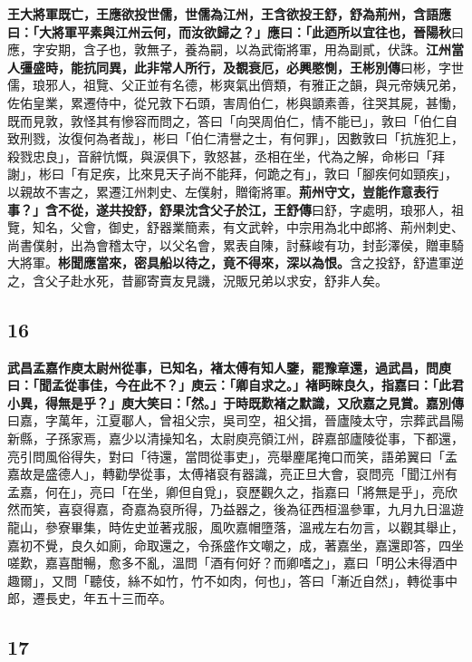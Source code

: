 \textbf{王大將軍既亡，王應欲投世儒，世儒為江州，王含欲投王舒，舒為荊州，含語應曰：「大將軍平素與江州云何，而汝欲歸之？」應曰：「此迺所以宜往也，}{\footnotesize \textbf{晉陽秋}曰應，字安期，含子也，敦無子，養為嗣，以為武衛將軍，用為副貳，伏誅。}\textbf{江州當人彊盛時，能抗同異，此非常人所行，及覩衰厄，必興愍惻，}{\footnotesize \textbf{王彬別傳}曰彬，字世儒，琅邪人，祖覽、父正並有名德，彬爽氣出儕類，有雅正之韻，與元帝姨兄弟，佐佑皇業，累遷侍中，從兄敦下石頭，害周伯仁，彬與顗素善，往哭其屍，甚慟，既而見敦，敦怪其有慘容而問之，答曰「向哭周伯仁，情不能已」，敦曰「伯仁自致刑戮，汝復何為者哉」，彬曰「伯仁清譽之士，有何罪」，因數敦曰「抗旌犯上，殺戮忠良」，音辭忼慨，與涙俱下，敦怒甚，丞相在坐，代為之解，命彬曰「拜謝」，彬曰「有足疾，比來見天子尚不能拜，何跪之有」，敦曰「腳疾何如頸疾」，以親故不害之，累遷江州刺史、左僕射，贈衛將軍。}\textbf{荊州守文，豈能作意表行事？」含不從，遂共投舒，舒果沈含父子於江，}{\footnotesize \textbf{王舒傳}曰舒，字處明，琅邪人，祖覽，知名，父會，御史，舒器業簡素，有文武幹，中宗用為北中郎將、荊州刺史、尚書僕射，出為會稽太守，以父名會，累表自陳，討蘇峻有功，封彭澤侯，贈車騎大將軍。}\textbf{彬聞應當來，密具船以待之，竟不得來，深以為恨。}{\footnotesize 含之投舒，舒遣軍逆之，含父子赴水死，昔酈寄賣友見譏，況販兄弟以求安，舒非人矣。}

\subsection*{16}

\textbf{武昌孟嘉作庾太尉州從事，已知名，褚太傅有知人鑒，罷豫章還，過武昌，問庾曰：「聞孟從事佳，今在此不？」庾云：「卿自求之。」褚眄睞良久，指嘉曰：「此君小異，得無是乎？」庾大笑曰：「然。」于時既歎褚之默識，又欣嘉之見賞。}{\footnotesize \textbf{嘉別傳}曰嘉，字萬年，江夏鄳人，曾祖父宗，吳司空，祖父揖，晉廬陵太守，宗葬武昌陽新縣，子孫家焉，嘉少以清操知名，太尉庾亮領江州，辟嘉部廬陵從事，下都還，亮引問風俗得失，對曰「待還，當問從事吏」，亮舉麈尾掩口而笑，語弟翼曰「孟嘉故是盛德人」，轉勸學從事，太傅褚裒有器識，亮正旦大會，裒問亮「聞江州有孟嘉，何在」，亮曰「在坐，卿但自覓」，裒歷觀久之，指嘉曰「將無是乎」，亮欣然而笑，喜裒得嘉，奇嘉為裒所得，乃益器之，後為征西桓溫參軍，九月九日溫遊龍山，參寮畢集，時佐史並著戎服，風吹嘉帽墮落，溫戒左右勿言，以觀其舉止，嘉初不覺，良久如廁，命取還之，令孫盛作文嘲之，成，著嘉坐，嘉還即答，四坐嗟歎，嘉喜酣暢，愈多不亂，溫問「酒有何好？而卿嗜之」，嘉曰「明公未得酒中趣爾」，又問「聽伎，絲不如竹，竹不如肉，何也」，答曰「漸近自然」，轉從事中郎，遷長史，年五十三而卒。}

\subsection*{17}

